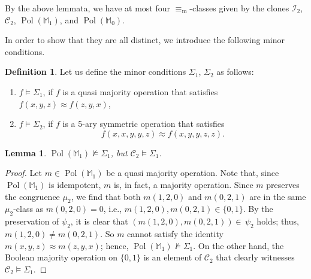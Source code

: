 \documentclass[12pt]{amsart}
\newtheorem{lemma}[theorem]{Lemma}
\theoremstyle{definition}
\theoremstyle{definition}
\newtheorem{definition}[theorem]{Definition}
\DeclareMathOperator{\Pol}{Pol}
\newcommand{\minorequivalentto}{\equiv_{\mathrm{m}}}
\begin{document}
By the above lemmata, we have at most four $\minorequivalentto$-classes given by the clones $\mathcal I_2$, $\mathcal C_2$, $\Pol(\mathbb M_1)$, and $\Pol(\mathbb M_0)$. 

In order to show that they are all distinct, we introduce the following minor conditions.

\begin{definition} \label{def:MinorConditions2} Let us define the minor conditions $\Sigma_1$, $\Sigma_2$ as follows:
\begin{enumerate}
\item $f \models \Sigma_1$, if $f$ is a quasi majority operation that satisfies $f(x,y,z) \approx f(z,y,x)$,
\item $f \models \Sigma_2$, if $f$ is a 5-ary symmetric operation that satisfies \[f(x,x,y,y,z)\approx f(x,y,y,z,z).\]
\end{enumerate}
\end{definition}


\begin{lemma}\label{lem:separationSDM1andC2}
$\Pol(\mathbb M_1) \not\models \Sigma_1$, but $\mathcal C_2 \models \Sigma_1$.
\end{lemma}
\begin{proof}
Let $m \in \Pol(\mathbb M_1)$ be a quasi majority operation. Note that, since $\Pol(\mathbb M_1)$ is idempotent, $m$ is, in fact, a majority operation. Since $m$ preserves the congruence $\mu_2$, we find that both $m(1,2,0)$ and $m(0,2,1)$ are in the same $\mu_2$-class as $m(0,2,0) = 0$, i.e., $m(1,2,0), m(0,2,1) \in \{0,1\}$. By the preservation of $\psi_2$, it is clear that $(m(1,2,0),  m(0,2,1))\in \,\psi_2$ holds; thus, $m(1,2,0) \neq m(0,2,1)$. So $m$ cannot satisfy the identity $m(x,y,z) \approx m(z,y,x)$; hence, $\Pol(\mathbb M_1) \not\models \Sigma_1$. On the other hand, the Boolean majority operation on $\{0,1\}$ is an element of $\mathcal C_2$ that clearly witnesses $\mathcal C_2 \models \Sigma_1$.
\end{proof}
\end{document}
